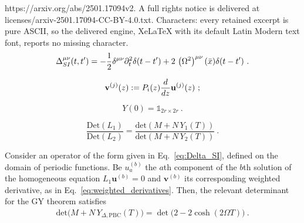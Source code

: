 \documentclass[10pt,a4paper]{amsart}
\begin{document}
https://arxiv.org/abs/2501.17094v2. A full rights notice is delivered at licenses/arxiv-2501.17094-CC-BY-4.0.txt. Characters: every retained excerpt is pure ASCII, so the delivered engine, XeLaTeX with its default Latin Modern text font, reports no missing character.
\begin{equation} \label{eq:Delta_SI}
{\Delta^{\mu\nu}_{\rm SI} (t,t')=-\frac12 \delta^{\mu\nu}\partial^2_t\delta(t-t')+2 \, \left(\Omega^2\right)^{\mu\nu}(\bar{x})\delta(t-t')}\ .
\end{equation}

\begin{align}\label{eq:weighted_derivatives}
 \mathbf{v}^{(j)}(z):=P_i(z)\frac{{\rm d}}{{\rm d}z}\mathbf{u}^{(j)}(z)\ ;
\end{align}

\begin{equation} \label{BCY}
Y(0)=\mathbb{1}_{2r \times 2r}\ . 
\end{equation}

\begin{equation} \label{GY}
\frac{\mathrm{Det}(L_1)}{\mathrm{Det}(L_2)}=\frac{\mathrm{det}(M+N \, Y_1(T))}{\mathrm{det}(M+N \, Y_2(T))}\ .
\end{equation}

\begin{theorem}\label{th:GY_periodic}
Consider an operator of the form given in Eq.~\eqref{eq:Delta_SI}, defined on the domain of periodic functions. Be $u_a^{(b)}$ the $a$th component of the $b$th solution of the homogeneous equation $L_1 \mathbf{u}^{(b)}=0$ and $\mathbf{v}^{(b)}$ its corresponding weighted derivative, as in Eq.~\eqref{eq:weighted_derivatives}. 
Then, the relevant determinant for the GY theorem satisfies
\begin{align}\label{eq:theorem}
\mathrm{det}\Big(M+N \, Y_{\Delta, \mathrm{PBC}}(T)\Big)
=\det \big(2-2\cosh(2\Omega T)\big)\ .
\end{align}
\end{theorem}
\end{document}
